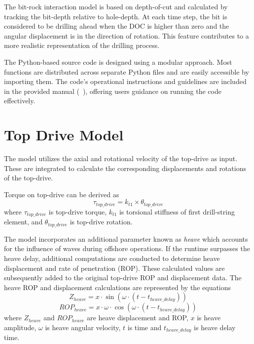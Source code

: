 The bit-rock interaction model is based on depth-of-cut and calculated by tracking the bit-depth relative to hole-depth. At each time step, the bit is considered to be drilling ahead when the DOC is higher than zero and the angular displacement is in the direction of rotation.  This feature contributes to a more realistic representation of the drilling process.

The Python-based source code is designed using a modular approach.  Most functions are distributed across separate Python files and are easily accessible by importing them. The code's operational instructions and guidelines are included in the provided manual (~\cite{ref:dixit2021a}), offering users guidance on running the code effectively.

\section{Top Drive Model}
The model utilizes the axial and rotational velocity of the top-drive as input.  These are integrated to calculate the corresponding displacements and rotations of the top-drive.

Torque on top-drive can be derived as
\begin{equation}\label{TorqueEQ}
  \tau_{top\_drive} = k_{t1} \times \theta_{top\_drive}
\end{equation}
where $\tau_{top\_drive}$ is top-drive torque, $k_{t1}$ is torsional stiffness of first drill-string element, and $\theta_{top\_drive}$ is top-drive rotation.

The model incorporates an additional parameter known as \emph{heave} which accounts for the influence of waves during offshore operations. If the runtime surpasses the heave delay, additional computations are conducted to determine heave displacement and rate of penetration (ROP). These calculated values are subsequently added to the original top-drive ROP and displacement data. The heave ROP and displacement calculations are represented by the equations
\begin{equation}\label{Z_heave}
  Z_{heave} = x \cdot \sin(\omega \cdot (t - t_{heave\_delay}))
\end{equation}
\begin{equation}\label{ROP_heave}
  ROP_{heave} = x \cdot \omega \cdot \cos(\omega \cdot (t - t_{heave\_delay}))
\end{equation}
where 
$Z_{heave}$ and $ROP_{heave}$ are heave displacement and ROP, $x$ is heave amplitude, $\omega$ is heave angular velocity, $t$ is time and $t_{heave\_delay}$ is heave delay time.
 
